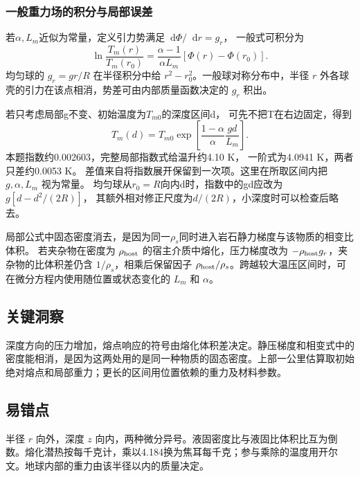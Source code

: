 \documentclass[UTF8,fontset=fandol,a4paper,11pt]{ctexart}
\newcommand{\dd}{\mathop{}\!\mathrm{d}}
\begin{document}
\subsubsection*{一般重力场的积分与局部误差}
若$\alpha,L_m$近似为常量，定义引力势满足$\dd\Phi/\dd r=g_r$，
一般式可积分为
\[
\ln\frac{T_m(r)}{T_m(r_0)}
=\frac{\alpha-1}{\alpha L_m}[\Phi(r)-\Phi(r_0)].
\]
均匀球的 $g_r=gr/R$ 在半径积分中给 $r^2-r_0^2$。一般球对称分布中，半径 $r$ 外各球壳的引力在该点相消，势差可由内部质量函数决定的 $g_r$ 积出。

若只考虑局部g不变、初始温度为$T_{m0}$的深度区间d，
可先不把T在右边固定，得到
\[
T_m(d)=T_{m0}\exp\left[\frac{1-\alpha}{\alpha}\frac{gd}{L_m}\right].
\]
本题指数约0.002603，完整局部指数式给温升约4.10 K，
一阶式为4.0941 K，两者只差约0.0053 K。
差值来自将指数展开保留到一次项。这里在所取区间内把 $g,\alpha,L_m$ 视为常量。
均匀球从$r_0=R$向内d时，指数中的gd应改为$g[d-d^2/(2R)]$，
其额外相对修正尺度为$d/(2R)$，小深度时可以检查后略去。

局部公式中固态密度消去，是因为同一$\rho_s$同时进入岩石静力梯度与该物质的相变比体积。
若夹杂物在密度为 $\rho_{\rm host}$ 的宿主介质中熔化，压力梯度改为 $-\rho_{\rm host}g_r$，夹杂物的比体积差仍含 $1/\rho_s$，相乘后保留因子 $\rho_{\rm host}/\rho_s$。跨越较大温压区间时，可在微分方程内使用随位置或状态变化的 $L_m$ 和 $\alpha$。




\subsection*{关键洞察}

深度方向的压力增加，熔点响应的符号由熔化体积差决定。静压梯度和相变式中的密度能相消，是因为这两处用的是同一种物质的固态密度。上部一公里估算取初始绝对熔点和局部重力；更长的区间用位置依赖的重力及材料参数。



\subsection*{易错点}

半径 $r$ 向外，深度 $z$ 向内，两种微分异号。液固密度比与液固比体积比互为倒数。熔化潜热按每千克计，乘以4.184换为焦耳每千克；参与乘除的温度用开尔文。地球内部的重力由该半径以内的质量决定。
\end{document}
